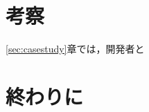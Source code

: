 \documentclass[T,J]{fose} %
\begin{document}
\section{考察}\label{sec:discussion}
\ref{sec:casestudy}章では，開発者と

\section{終わりに}\label{sec:conclusion}



\end{document}

